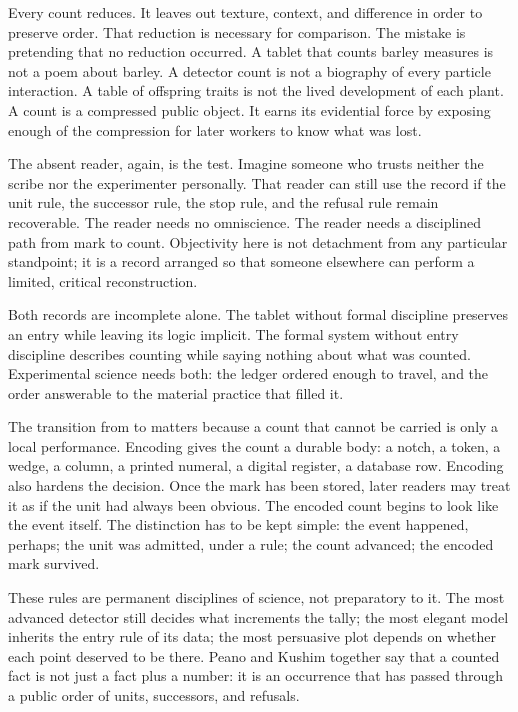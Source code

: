Every count reduces. It leaves out texture, context, and difference in
order to preserve order. That reduction is necessary for comparison. The mistake is pretending that
no reduction occurred. A tablet
that counts barley measures is not a poem about barley. A detector count
is not a biography of every particle interaction. A table of offspring
traits is not the lived development of each plant.
A count is a compressed public object. It earns its evidential force by
exposing enough of the compression for later workers to know what was lost.

The absent reader, again, is the test. Imagine someone who trusts neither
the scribe nor the experimenter personally. That reader can still use the
record if the unit rule, the successor rule, the stop rule, and the
refusal rule remain recoverable. The reader needs no omniscience. The
reader needs a disciplined path from mark to count. Objectivity here is
not detachment from any particular standpoint; it is a record arranged so
that someone elsewhere can perform a limited, critical reconstruction.

Both records are incomplete alone. The tablet without formal discipline
preserves an entry while leaving its logic implicit. The formal system
without entry discipline describes counting while saying nothing about what
was counted. Experimental science needs both: the ledger ordered enough to
travel, and the order answerable to the material practice that filled it.

The transition from  to  matters because a
count that cannot be carried is only a local performance. Encoding gives
the count a durable body: a notch, a token, a wedge, a column, a printed
numeral, a digital register, a database row. Encoding also hardens the
decision. Once the mark has been stored, later readers may treat it as if
the unit had always been obvious. The encoded count begins to look like
the event itself. The distinction has to be kept simple: the event
happened, perhaps; the unit was admitted, under a rule; the count
advanced; the encoded mark survived.

These rules are permanent disciplines of science, not preparatory to it.
The most advanced detector still decides what increments the tally; the
most elegant model inherits the entry rule of its data; the most persuasive
plot depends on whether each point deserved to be there. Peano and Kushim
together say that a counted fact is not just a fact plus a number: it is
an occurrence that has passed through a public order of units, successors,
and refusals.

